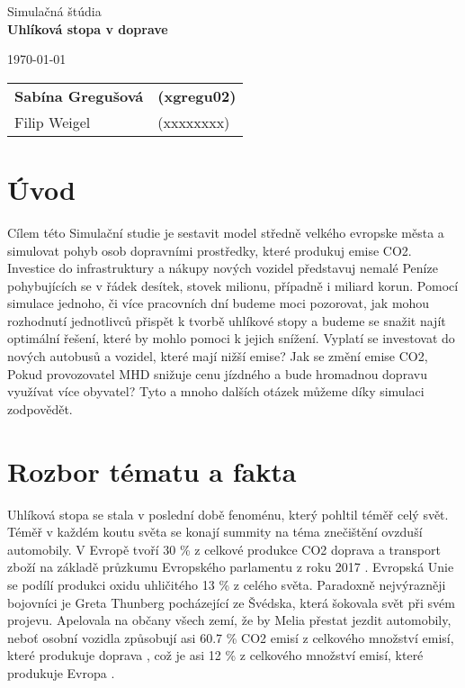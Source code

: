 \documentclass[a4paper, 11pt]{article}
\begin{document}
\begin{titlepage}
\begin{center}


\Huge{Simulačná štúdia} \\
\LARGE{\textbf{Uhlíková stopa v doprave}} \\

\end{center}

\begin{minipage}{0.5 \textwidth}
\Large
\today
\end{minipage}
\hfill
\begin{minipage}[r]{0.5 \textwidth}
\Large
\begin{tabular}{ll}
\textbf{Sabína Gregušová} & \textbf{(xgregu02)} \\
Filip Weigel & (xxxxxxxx)
\end{tabular}
\end{minipage}
\end{titlepage}

\clearpage
\tableofcontents


\clearpage
{}
\setcounter{page}{1}

\section{Úvod}
Cílem této Simulační studie je sestavit model středně velkého evropske města a simulovat pohyb osob dopravními prostředky, které produkuj emise CO2. Investice do infrastruktury a nákupy nových vozidel představuj nemalé Peníze pohybujících se v řádek desítek, stovek milionu, případně i miliard korun. Pomocí simulace jednoho, či více pracovních dní budeme moci pozorovat, jak mohou rozhodnutí jednotlivců přispět k tvorbě uhlíkové stopy a budeme se snažit najít optimální řešení, které by mohlo pomoci k jejich snížení. Vyplatí se investovat do nových autobusů a vozidel, které mají nižší emise? Jak se změní emise CO2, Pokud provozovatel MHD snižuje cenu jízdného a bude hromadnou dopravu využívat více obyvatel? Tyto a mnoho dalších otázek můžeme díky simulaci zodpovědět. 

\section{Rozbor tématu a fakta}
Uhlíková stopa se stala v poslední době fenoménu, který pohltil téměř celý svět. Téměř v každém koutu světa se konají summity na téma znečištění ovzduší automobily. V Evropě tvoří 30 \% z celkové produkce CO2 doprava a transport zboží na základě průzkumu Evropského parlamentu z roku 2017 \cite {co2_eu}. Evropská Unie se podílí produkci oxidu uhličitého 13 \% z celého světa. Paradoxně nejvýrazněji bojovníci je Greta Thunberg pocházející ze Švédska, která šokovala svět při svém projevu. Apelovala na občany všech zemí, že by Melia přestat jezdit automobily, neboť osobní vozidla způsobují asi 60.7 \% CO2 emisí z celkového množství emisí, které produkuje doprava \cite {co2_eu}, což je asi 12 \% z celkového množství emisí, které produkuje Evropa \cite {co2_eu_law}.
\end{document}
